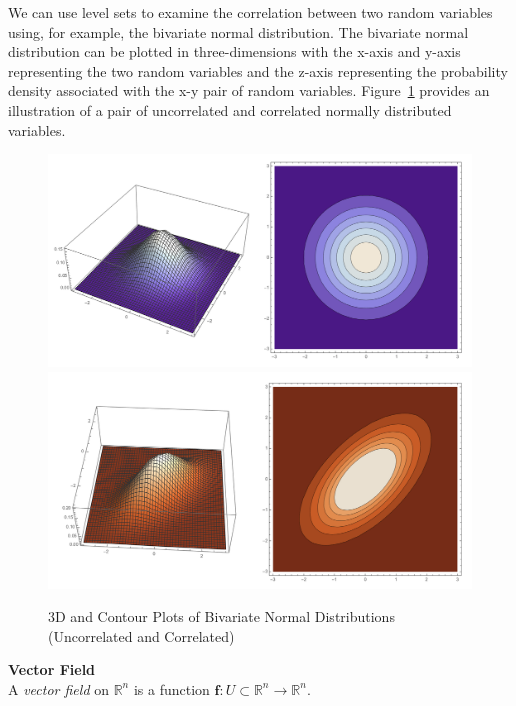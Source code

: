 \documentclass[12pt]{article}
\begin{document}
We can use level sets to examine the correlation between two random variables using, for example, the bivariate normal distribution. The bivariate normal distribution can be plotted in three-dimensions with the x-axis and y-axis representing the two random variables and the z-axis representing the probability density associated with the x-y pair of random variables. Figure~\ref{bivariatenormal} provides an illustration of a pair of uncorrelated and correlated normally distributed variables.\\

\begin{figure}[h]
\centering
\caption{3D and Contour Plots of Bivariate Normal Distributions (Uncorrelated and Correlated)}
\label{bivariatenormal}
\indent\includegraphics[scale=0.3]{bivariate_3d.png}
\indent\includegraphics[scale=0.3]{bivariatecorr_3d.png}
\end{figure}

\begin{framed}
\textbf{Vector Field} \\
A \emph{vector field} on $\mathbb{R}^n$ is a function $\mathbf{f}:U\subset\mathbb{R}^n\rightarrow\mathbb{R}^n$. \\ 
\end{framed}
\end{document}

